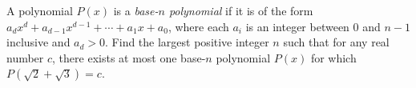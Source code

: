 A polynomial $P(x)$ is a \emph{base-$n$ polynomial} if it is of the form $a_dx^d+a_{d-1}x^{d-1}+\cdots + a_1x+a_0$,  where each $a_i$ is an integer between $0$ and $n-1$ inclusive and $a_d>0$. Find the largest positive integer $n$ such that for any real number $c$,  there exists at most one base-$n$ polynomial $P(x)$ for which $P(\sqrt 2+\sqrt 3)=c$.